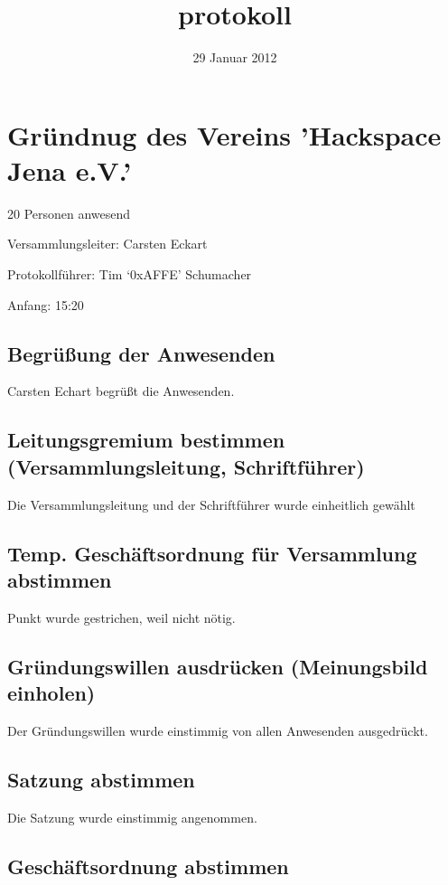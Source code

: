 \documentclass[11pt]{article}
\title{protokoll}
\author{}
\date{29 Januar 2012}
\begin{document}
\maketitle

\setcounter{tocdepth}{3}
\tableofcontents
\vspace*{1cm}
\section{Gründnug des Vereins 'Hackspace Jena e.V.'}
\label{sec-1}

20 Personen anwesend

Versammlungsleiter: Carsten Eckart

Protokollführer: Tim `0xAFFE' Schumacher

Anfang: 15:20
\subsection{Begrüßung der Anwesenden}
\label{sec-1.1}

Carsten Echart begrüßt die Anwesenden.
\subsection{Leitungsgremium bestimmen (Versammlungsleitung, Schriftführer)}
\label{sec-1.2}

Die Versammlungsleitung und der Schriftführer wurde einheitlich gewählt
\subsection{Temp. Geschäftsordnung für Versammlung abstimmen}
\label{sec-1.3}

Punkt wurde gestrichen, weil nicht nötig.
\subsection{Gründungswillen ausdrücken (Meinungsbild einholen)}
\label{sec-1.4}

Der Gründungswillen wurde einstimmig von allen Anwesenden ausgedrückt.
\subsection{Satzung abstimmen}
\label{sec-1.5}

Die Satzung wurde einstimmig angenommen.
\subsection{Geschäftsordnung abstimmen}
\label{sec-1.6}
\end{document}
